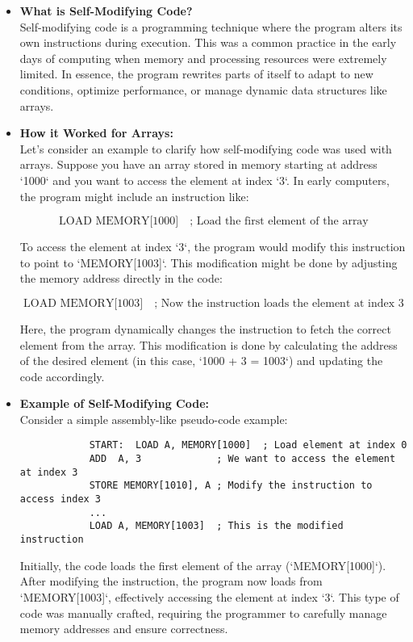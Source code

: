 \documentclass{book}
\begin{document}
	\begin{itemize}
		\item \textbf{What is Self-Modifying Code?} \\
		Self-modifying code is a programming technique where the program alters its own instructions during execution. This was a common practice in the early days of computing when memory and processing resources were extremely limited. In essence, the program rewrites parts of itself to adapt to new conditions, optimize performance, or manage dynamic data structures like arrays.
		
		\item \textbf{How it Worked for Arrays:} \\
		Let's consider an example to clarify how self-modifying code was used with arrays. Suppose you have an array stored in memory starting at address `1000` and you want to access the element at index `3`. In early computers, the program might include an instruction like:
		
		\[
		\text{LOAD } \text{MEMORY[1000]} \quad \text{; Load the first element of the array}
		\]
		
		To access the element at index `3`, the program would modify this instruction to point to `MEMORY[1003]`. This modification might be done by adjusting the memory address directly in the code:
		
		\[
		\text{LOAD } \text{MEMORY[1003]} \quad \text{; Now the instruction loads the element at index 3}
		\]
		
		Here, the program dynamically changes the instruction to fetch the correct element from the array. This modification is done by calculating the address of the desired element (in this case, `1000 + 3 = 1003`) and updating the code accordingly.
		
		\item \textbf{Example of Self-Modifying Code:} \\
		Consider a simple assembly-like pseudo-code example:
		\begin{verbatim}
			START:  LOAD A, MEMORY[1000]  ; Load element at index 0
			ADD  A, 3             ; We want to access the element at index 3
			STORE MEMORY[1010], A ; Modify the instruction to access index 3
			...
			LOAD A, MEMORY[1003]  ; This is the modified instruction
		\end{verbatim}
		
		Initially, the code loads the first element of the array (`MEMORY[1000]`). After modifying the instruction, the program now loads from `MEMORY[1003]`, effectively accessing the element at index `3`. This type of code was manually crafted, requiring the programmer to carefully manage memory addresses and ensure correctness.
		

\end{itemize}
\end{document}
